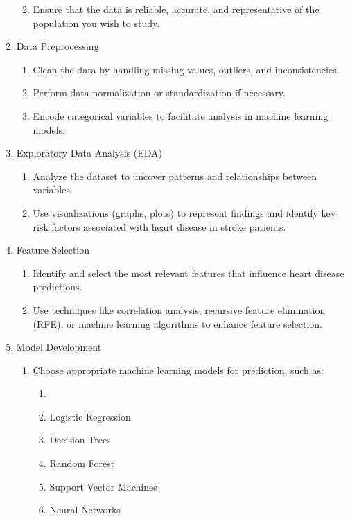 \documentclass[runningheads]{llncs}
\begin{document}
\begin{enumerate}
\begin{enumerate}
\begin{enumerate}
    \end{enumerate}
    \item Ensure that the data is reliable, accurate, and representative of the population you wish to study. 
\end{enumerate}
\item Data Preprocessing
    \begin{enumerate}
        \item Clean the data by handling missing values, outliers, and inconsistencies. 
        \item Perform data normalization or standardization if necessary. 
        \item Encode categorical variables to facilitate analysis in machine learning models. 
    \end {enumerate}
\item  Exploratory Data Analysis (EDA)
    \begin{enumerate}
        \item Analyze the dataset to uncover patterns and relationships between variables. 
        \item Use visualizations (graphs, plots) to represent findings and identify key risk factors associated with heart disease in stroke patients. 
    \end{enumerate}
\item Feature Selection
\begin{enumerate}
    \item Identify and select the most relevant features that influence heart disease predictions. 
    \item Use techniques like correlation analysis, recursive feature elimination (RFE), or machine learning algorithms to enhance feature selection. 
\end{enumerate}
\item Model Development
    \begin{enumerate}
        \item Choose appropriate machine learning models for prediction, such as: 
            \begin{enumerate}
                \item \item Logistic Regression
                \item Decision Trees 
                \item Random Forest 
                \item Support Vector Machines 
                \item Neural Networks 

\end{enumerate}
\end{enumerate}
\end{enumerate}
\end{document}
